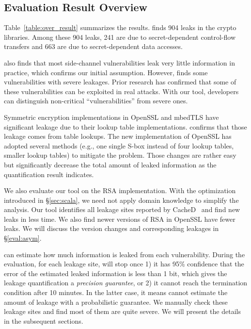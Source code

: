 \subsection{Evaluation Result Overview} \label{sec:eval_overview}
Table~\ref{table:over_result} summarizes the results. 
\tool{} finds 904 leaks in the crypto libraries. 
Among these 904 leaks, 241 are due to secret-dependent 
control-flow transfers and 663 are due to secret-dependent data accesses.

\tool{} also finds that most side-channel
vulnerabilities leak very little information in practice, which confirms our
initial assumption.  
However, \tool{} finds some vulnerabilities with severe
leakages. Prior research has confirmed that some of these
vulnerabilities can be exploited in real attacks.
With our tool, developers can
distinguish non-critical ``vulnerabilities'' from severe ones.

Symmetric encryption implementations in OpenSSL and mbedTLS have significant leakage due to their lookup table implementations. 
\tool{} confirms that those leakage comes from table lookups. The new implementation of OpenSSL has adopted several methods (e.g., one single S-box instead of four lookup tables, smaller lookup tables) to mitigate the problem. Those changes are rather easy but significantly decrease the total amount of leaked information as the quantification result indicates.

We also evaluate our tool on the RSA implementation. With the optimization
introduced in \S\ref{sec:scala}, we need not apply domain knowledge to
simplify the analysis. Our tool identifies all leakage sites
reported by CacheD~\cite{203878} and find new leaks in less time. 
We also find newer
versions of RSA in OpenSSL have fewer leaks. We
will discuss the version changes and corresponding leakages in \S\ref{eval:asym}.

\tool{} can estimate how
much information is leaked from each vulnerability. During the evaluation,
for each leakage site, \tool{} will stop once 1) it has 95\% confidence
that the error of the estimated leaked information is less than 1 bit,
which gives the leakage quantification a \emph{precision guarantee}, 
or 2) it cannot reach the termination condition after 10 minutes.  In
the latter case, it means \tool{} cannot estimate the amount of leakage with a
probabilistic guarantee.
\label{loc:timeout}
We manually check these leakage sites and find most of them are quite severe.
We will present the details in the subsequent sections.


